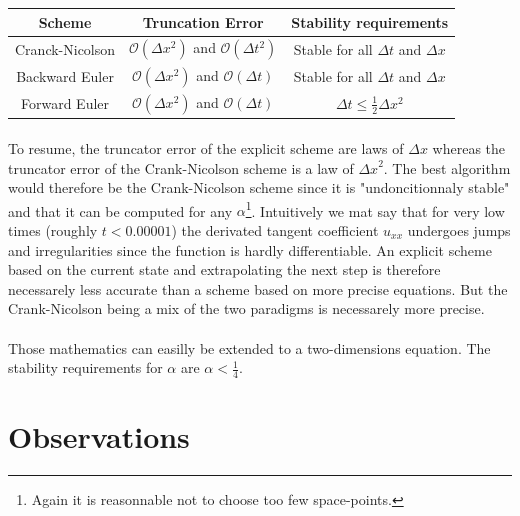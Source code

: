 \documentclass[a4paper, twoside, 11pt]{report}
\theoremstyle{theorem}
\theoremstyle{remark}
\theoremstyle{exemple}
\begin{document}
            \begin{center}
            \begin{tabular}{|*{3}{c|}}
                \hline
                Scheme & Truncation Error & Stability requirements\\
                \hline
                \hline
                Cranck-Nicolson & $\mathcal{O}(\Delta x^2)$ and $\mathcal{O}(\Delta t^2)$ & Stable for all $\Delta t$ and $\Delta x$ \\
                \hline
                Backward Euler & $\mathcal{O}(\Delta x^2)$ and $\mathcal{O}(\Delta t)$ & Stable for all $\Delta t$ and $\Delta x$ \\
                \hline
                Forward Euler & $\mathcal{O}(\Delta x^2)$ and $\mathcal{O}(\Delta t)$ & $\Delta t \leq \frac{1}{2}\Delta x^2$\\
                \hline
            \end{tabular}
            \end{center}

        \paragraph{}To resume, the truncator error of the explicit scheme are laws of $\Delta x$ whereas the truncator error of the Crank-Nicolson scheme is a law of ${\Delta x}^{2}$. The best algorithm would therefore be the Crank-Nicolson scheme since it is "undoncitionnaly stable" and that it can be computed for any $\alpha$\footnote{Again it is reasonnable not to choose too few space-points.}. Intuitively we mat say that for very low times (roughly $t<0.00001$) the derivated tangent coefficient ${u}_{xx}$ undergoes jumps and irregularities since the function is hardly differentiable. An explicit scheme based on the current state and extrapolating the next step is therefore necessarely less accurate than a scheme based on more precise equations. But the Crank-Nicolson being a mix of the two paradigms is necessarely more precise.

        \paragraph{}Those mathematics can easilly be extended to a two-dimensions equation. The stability requirements for $\alpha$ are $\alpha < \frac{1}{4}$.

    \section{Observations}
\end{document}
